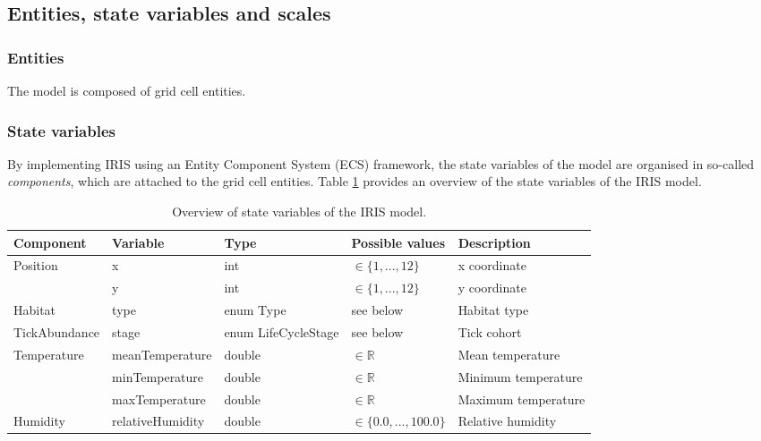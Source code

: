 \documentclass[a4paper, 11pt]{scrartcl}
\begin{document}
\subsection{Entities, state variables and scales}

\subsubsection{Entities}
The model is composed of grid cell entities.

\subsubsection{State variables}
By implementing IRIS using an Entity Component System (ECS) framework, the state variables of the model are organised in so-called \textit{components}, which are attached to the grid cell entities. Table \ref{tab:state_variables} provides an overview of the state variables of the IRIS model.

\begin{table}[H]
\caption[Overview of state variables of the IRIS model.]{Overview of state variables of the IRIS model.}
\label{tab:state_variables}
\begin{tabularx}{\textwidth}{lllll}
\toprule
\textbf{Component} & \textbf{Variable} & \textbf{Type} & \textbf{Possible values} & \textbf{Description} \\
\midrule
\multirow{2}{*}{Position} 	 & x  				& int  		& $\in \{1,...,12\}$  & x coordinate \\
							 & y    			& int  		& $\in \{1,...,12\}$ & y coordinate \\
Habitat 				  	 & type 			& enum Type & see below & Habitat type \\
TickAbundance 			  	 & stage 			& enum LifeCycleStage  & see below & Tick cohort \\
\multirow{3}{*}{Temperature} & meanTemperature  & double  	& $\in \mathbb{R}$ & Mean temperature \\
							 & minTemperature   & double  	& $\in \mathbb{R}$ & Minimum temperature \\
							 & maxTemperature   & double  	& $\in \mathbb{R}$ & Maximum temperature \\
Humidity 					 & relativeHumidity & double  	& $\in \{0.0,...,100.0\}$ & Relative humidity \\
\bottomrule
\end{tabularx}
\end{table}
\end{document}
